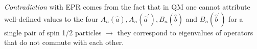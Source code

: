 \documentclass[12pt]{article}
\begin{document}
\emph{Contradiction} with EPR comes from the fact that
in QM one cannot attribute well-defined values
to the four 
\(A_{n}\left(\hat{a}\right), 
  A_{n}\left(\hat{a}^{\prime}\right), 
  B_{n}(\hat{b})\) and
\(B_{n}(\hat{b}^{\prime})\) for
a single pair of spin 1/2 particles $\to$
they correspond to eigenvalues of
operators that do not commute
with each other.
\end{document}

